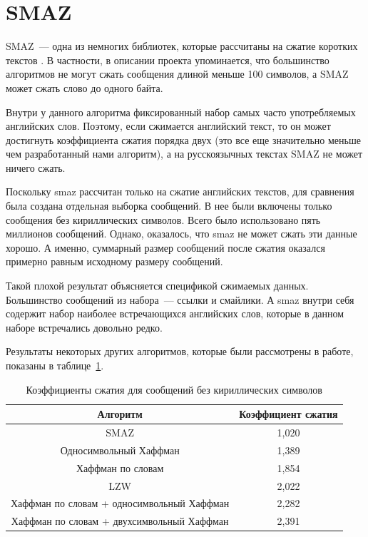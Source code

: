 \section{SMAZ}

SMAZ~--- одна из немногих библиотек, которые рассчитаны на сжатие коротких текстов \cite{smaz}. В частности, в описании проекта
упоминается, что большинство алгоритмов не могут сжать сообщения длиной меньше 100 символов, а SMAZ может сжать слово  до одного байта.

Внутри у данного алгоритма фиксированный набор самых часто употребляемых английских слов. Поэтому, если сжимается английский текст, то он может достигнуть 
коэффициента сжатия порядка двух (это все еще значительно меньше чем разработанный нами алгоритм), а на русскоязычных текстах SMAZ не может ничего сжать.

Поскольку smaz рассчитан только на сжатие английских текстов, для сравнения была создана отдельная выборка сообщений. В нее были включены
только сообщения без кириллических символов. Всего было использовано пять миллионов сообщений. Однако, оказалось, что smaz не может сжать эти данные хорошо.
А именно, суммарный размер сообщений после сжатия оказался примерно равным исходному размеру сообщений. 

Такой плохой результат объясняется спецификой сжимаемых данных. Большинство сообщений из набора~--- ссылки и смайлики. А smaz внутри себя содержит 
набор наиболее встречающихся английских слов, которые в данном наборе встречались довольно редко. 

Результаты некоторых других алгоритмов, которые были рассмотрены в работе, показаны в таблице~\ref{tab1}.

\begin{table}[!h]
\caption{Коэффициенты сжатия для сообщений без кириллических символов}\label{tab1}
\centering
\begin{tabular}{|*{2}{c|}}\hline
Алгоритм & Коэффициент сжатия \\\hline
SMAZ & 1,020 \\\hline
Односимвольный Хаффман & 1,389 \\\hline
Хаффман по словам & 1,854 \\\hline
LZW & 2,022 \\\hline
Хаффман по словам + односимвольный Хаффман & 2,282 \\\hline
Хаффман по словам + двухсимвольный Хаффман & 2,391 \\\hline
\end{tabular}
\end{table}

